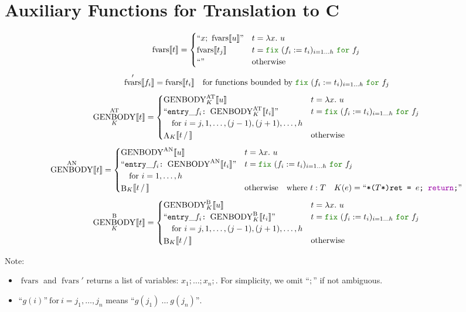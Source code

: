 \documentclass[a4paper,fleqn]{article}
\newcommand{\kwfix}{\mbox{\color{mygreen}\ttfamily fix}}
\newcommand{\kwfor}{\mbox{\color{mygreen}\ttfamily for}}
\newcommand{\lam}[2]{\lambda #1.~#2}
\newcommand{\fix}[4]{\kwfix~(#1 := #2)_{#3}~\kwfor~#4}
\newcommand{\BRA}[1]{\llbracket #1 \rrbracket}
\DeclareMathOperator{\genbody}{GENBODY}
\newcommand{\genbodyat}[2]{\genbody^\mathrm{AT}_{#1}\BRA{#2}}
\newcommand{\genbodyan}[1]{\genbody^\mathrm{AN}\BRA{#1}}
\newcommand{\genbodyb}[2]{\genbody^\mathrm{B}_{#1}\BRA{#2}}
\newcommand{\dq}[1]{\text{``}#1\text{''}}
\newcommand{\ttcolon}{\texttt{:}}
\newcommand{\kwCreturn}{\mbox{\color{myviolet}\ttfamily return}}
\DeclareMathOperator{\fvarsop}{fvars}
\newcommand{\fvars}[1]{\fvarsop\BRA{#1}}
\newcommand{\fvarsd}[1]{\fvarsop'\BRA{#1}}
\DeclareMathOperator{\Aop}{A}
\DeclareMathOperator{\Bop}{B}
\newcommand{\A}[3]{\Aop_{#1}\BRA{#2\,/\,#3}}
\newcommand{\B}[3]{\Bop_{#1}\BRA{#2\,/\,#3}}
\begin{document}
\section{Auxiliary Functions for Translation to C}\label{sec:aux-function}
\raggedright
\[
  \fvars{t} =
  \begin{cases}
    \dq{x;~\fvars{u}} & t = \lam{x}{u} \\
    \fvars{t_j}       & t = \fix{f_i}{t_i}{i=1\dots h}{f_j} \\
    \dq{}             & \text{otherwise}
  \end{cases}
\]
\[
  \fvarsd{f_i} = \fvars{t_i} \quad \text{for functions bounded by $\fix{f_i}{t_i}{i=1\dots h}{f_j}$}
\]
\[
  \genbodyat{K}{t} =
  \begin{cases}
    \genbodyat{K}{u}                            & t = \lam{x}{u} \\
    \dq{\mathtt{entry\_}f_i\ttcolon~\genbodyat{K}{t_i}} & t = \fix{f_i}{t_i}{i=1\dots h}{f_j} \\
    \quad \text{for}~i=j, 1,\dots, (j-1), (j+1),\dots, h \\
    \A{K}{t}{}                            & \text{otherwise}
  \end{cases}
\]
\[
  \genbodyan{t} =
  \begin{cases}
    \genbodyan{u}                            & t = \lam{x}{u} \\
    \dq{\mathtt{entry\_}f_i\ttcolon~\genbodyan{t_i}} & t = \fix{f_i}{t_i}{i=1\dots h}{f_j} \\
    \quad \text{for}~i=1,\dots, h \\
    \B{K}{t}{}                            & \text{otherwise} \quad \text{where}~t:T \quad K(e) = \dq{\texttt{*($T$*)ret = $e$; \kwCreturn;}}
  \end{cases}
\]
\[
  \genbodyb{K}{t} =
  \begin{cases}
    \genbodyb{K}{u}                            & t = \lam{x}{u} \\
    \dq{\mathtt{entry\_}f_i\ttcolon~\genbodyb{K}{t_i}} & t = \fix{f_i}{t_i}{i=1\dots h}{f_j} \\
    \quad \text{for}~i=j, 1,\dots, (j-1), (j+1),\dots, h \\
    \B{K}{t}{}                            & \text{otherwise}
  \end{cases}
\]
{\small Note:
\begin{itemize}
  \item $\fvarsop$ and $\fvarsop'$ returns a list of variables: $x_1;\dots;x_n;$.  For simplicity, we omit ``$;$'' if not ambiguous.
  \item $\dq{g(i)}~\text{for}~i=j_1,\dots,j_n$ means $\dq{g(j_1)~\dots~g(j_n)}$.
\end{itemize}}
\end{document}

